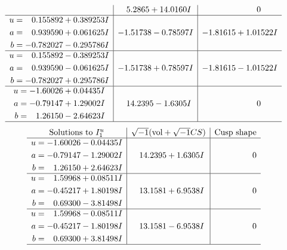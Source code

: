 \documentclass[1p]{elsarticle_modified}
\theoremstyle{definition}
\newcommand{\I}{\sqrt{-1}}
\begin{document}
$$\begin{array}{c|c|c}
 & \phantom{-}5.2865 + 14.0160 I & \phantom{-0.000000 } 0 \\ \hline\begin{aligned}
u &= \phantom{-}0.155892 + 0.389253 I \\
a &= \phantom{-}0.939590 + 0.061625 I \\
b &= -0.782027 - 0.295786 I\end{aligned}
 & -1.51738 - 0.78597 I & -1.81615 + 1.01522 I \\ \hline\begin{aligned}
u &= \phantom{-}0.155892 - 0.389253 I \\
a &= \phantom{-}0.939590 - 0.061625 I \\
b &= -0.782027 + 0.295786 I\end{aligned}
 & -1.51738 + 0.78597 I & -1.81615 - 1.01522 I \\ \hline\begin{aligned}
u &= -1.60026 + 0.04435 I \\
a &= -0.79147 + 1.29002 I \\
b &= \phantom{-}1.26150 - 2.64623 I\end{aligned}
 & \phantom{-}14.2395 - 1.6305 I & \phantom{-0.000000 } 0\\
 \hline 
 \end{array}$$\newpage$$\begin{array}{c|c|c}  
\text{Solutions to }I^u_{1}& \I (\text{vol} + \sqrt{-1}CS) & \text{Cusp shape}\\
 \hline 
\begin{aligned}
u &= -1.60026 - 0.04435 I \\
a &= -0.79147 - 1.29002 I \\
b &= \phantom{-}1.26150 + 2.64623 I\end{aligned}
 & \phantom{-}14.2395 + 1.6305 I & \phantom{-0.000000 } 0 \\ \hline\begin{aligned}
u &= \phantom{-}1.59968 + 0.08511 I \\
a &= -0.45217 + 1.80198 I \\
b &= \phantom{-}0.69300 - 3.81498 I\end{aligned}
 & \phantom{-}13.1581 + 6.9538 I & \phantom{-0.000000 } 0 \\ \hline\begin{aligned}
u &= \phantom{-}1.59968 - 0.08511 I \\
a &= -0.45217 - 1.80198 I \\
b &= \phantom{-}0.69300 + 3.81498 I\end{aligned}
 & \phantom{-}13.1581 - 6.9538 I & \phantom{-0.000000 } 0\\
 \hline 
 \end{array}$$\newpage\newpage\renewcommand{\arraystretch}{1}
\end{document}
